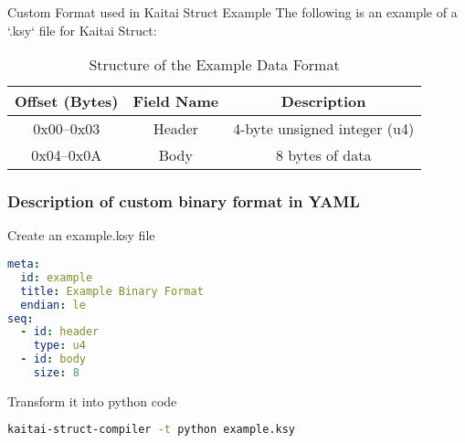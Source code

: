 
\begin{frame}[fragile]{Custom Format used in Kaitai Struct Example}
The following is an example of a `.ksy` file for Kaitai Struct:

\begin{table}
\centering
\renewcommand{\arraystretch}{1.5} %
\begin{tabular}{|c|c|c|}
\hline
\textbf{Offset (Bytes)} & \textbf{Field Name} & \textbf{Description} \\ \hline
0x00--0x03             & \cellcolor{headercolor} Header              & 4-byte unsigned integer (u4) \\ \hline
0x04--0x0A             & \cellcolor{bodycolor} Body                & 8 bytes of data              \\ \hline
\end{tabular}
\caption{Structure of the Example Data Format}
\end{table}

\begin{table}
\caption{Visualization of the Example File}
\end{table}

\end{frame}

\begin{frame}[fragile]
\frametitle{Description of custom binary format in YAML}

Create an example.ksy file

\begin{lstlisting}[language=yaml]
meta:
  id: example
  title: Example Binary Format
  endian: le
seq:
  - id: header
    type: u4
  - id: body
    size: 8
\end{lstlisting}

Transform it into python code

\begin{lstlisting}[language=bash,frame=single]
kaitai-struct-compiler -t python example.ksy
\end{lstlisting}
\end{frame}

